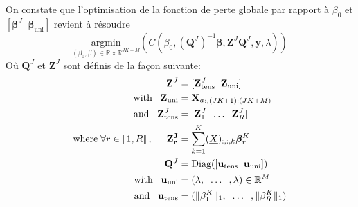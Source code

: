 \documentclass[10pt]{article}
\begin{document}

\noindent On constate que l'optimisation de la fonction de perte globale par rapport à $\beta_0$ et $[\mathbf{\beta}^J \; \; \mathbf{\beta}_{\text{uni}}]$ revient à
résoudre
\begin{equation}
\underset{(\beta_0, \beta) \in \mathbb{R} \times \mathbb{R}^{JK + M}}{\text{argmin}} \left( C(\beta_0, (\mathbf{Q}^J)^{-1}\mathbf{\beta},\mathbf{Z}^J \mathbf{Q}^J, \mathbf{y}, \lambda) \right)
\end{equation}
\noindent Où $\mathbf{Q}^J$ et $\mathbf{Z}^J$ sont définis de la façon suivante: 
\begin{align}
\mathbf{Z}^J &= [\mathbf{Z}_{\text{tens}}^J \; \; \mathbf{Z}_{\text{uni}}]\\
\text{with} \; \; \; \mathbf{Z}_{\text{uni}} &= {\mathbf{X}_a}_{:,(JK + 1): (JK + M)}\\
\text{and} \; \; \; \mathbf{Z}_{\text{tens}}^J	&= [\mathbf{Z}_1^J \; \; \hdots \; \; \mathbf{Z}_R^J]\\
\text{where} \; \forall r \in \llbracket 1, R\rrbracket\, , \hspace{0.5 cm} \mathbf{Z_r^J} &= \sum\limits_{k = 1}^K (\underline{X})_{:,:,k} \bm{\beta}_r^K\\
\hspace{7 pt}
\mathbf{Q}^J &= \text{Diag}([\mathbf{u}_{\text{tens}} \; \; \mathbf{u}_{\text{uni}}])\\
\text{with} \; \; \; \mathbf{u}_{\text{uni}} &= (\lambda,\; \; \hdots \; \; , \lambda) \in \mathbb{R}^M\\
\text{and} \; \; \; \mathbf{u}_{\text{tens}} &= (\lVert \mathbf{\beta}_1^K \rVert_1, \; \; \hdots \; \; ,\lVert \mathbf{\beta}_R^K \rVert_1)
\end{align}
\end{document}
